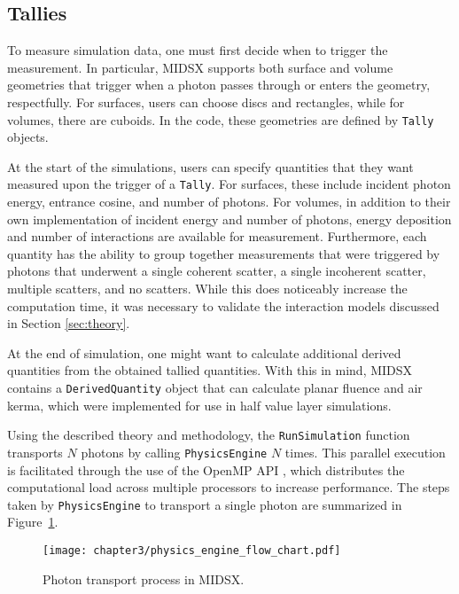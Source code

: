 \subsection{Tallies}
\par To measure simulation data, one must first decide when to trigger the measurement. In particular, MIDSX supports both surface and volume geometries that trigger when a photon passes through or enters the geometry, respectfully. For surfaces, users can choose discs and rectangles, while for volumes, there are cuboids. In the code, these geometries are defined by \texttt{Tally} objects.
\par At the start of the simulations, users can specify quantities that they want measured upon the trigger of a \texttt{Tally}. For surfaces, these include incident photon energy, entrance cosine, and number of photons. For volumes, in addition to their own implementation of incident energy and number of photons, energy deposition and number of interactions are available for measurement. Furthermore, each quantity has the ability to group together measurements that were triggered by photons that underwent a single coherent scatter, a single incoherent scatter, multiple scatters, and no scatters. While this does noticeably increase the computation time, it was necessary to validate the interaction models discussed in Section \ref{sec:theory}.
\par At the end of simulation, one might want to calculate additional derived quantities from the obtained tallied quantities. With this in mind, MIDSX contains a \texttt{DerivedQuantity} object that can calculate planar fluence and air kerma, which were implemented for use in half value layer simulations.
\vspace{1cm}
\par Using the described theory and methodology, the \texttt{RunSimulation} function transports $N$ photons by calling \texttt{PhysicsEngine} $N$ times. This parallel execution is facilitated through the use of the OpenMP API \cite{dagum1998openmp}, which distributes the computational load across multiple processors to increase performance. The steps taken by \texttt{PhysicsEngine} to transport a single photon are summarized in Figure~\ref{fig:PhysicsEngineFlowChart}.



\begin{figure}[H]
    \centering
	\texttt{[image: chapter3/physics\_engine\_flow\_chart.pdf]}
	\caption{Photon transport process in MIDSX.}
	\label{fig:PhysicsEngineFlowChart}
\end{figure}

